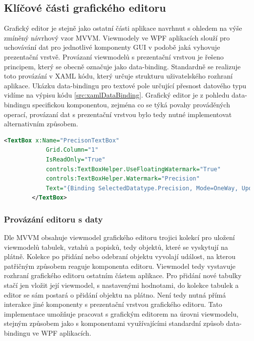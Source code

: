 \documentclass[czech,bachelor,public,dept460,male,oneside]{diploma}
\begin{document}
	\subsection{Klíčové části grafického editoru} \label{secKeyPartsEditor}
	Grafický editor je stejně jako ostatní části aplikace navrhnut s ohledem na výše zmíněný návrhový vzor MVVM. Viewmodely ve WPF aplikacích slouží pro uchovávání dat pro jednotlivé komponenty GUI v podobě jaká vyhovuje prezentační vrstvě. Provázaní viewmodelů s prezentační vrstvou je řešeno principem, který se obecně označuje jako data-binding. Standardně se realizuje toto provázání v XAML kódu, který určuje strukturu uživatelského rozhraní aplikace. Ukázku data-bindingu pro textové pole určující přesnost datového typu vidíme na výpisu kódu \ref{src:xamlDataBinding}. Grafický editor je z pohledu data-bindingu specifickou komponentou, zejména co se týká povahy prováděných operací, provázaní dat s prezentační vrstvou bylo tedy nutné implementovat alternativním způsobem. 
		
		\begin{lstlisting}[language=xml,label=src:xamlDataBinding,caption=Příklad data-bindingu v XAML pro textové pole]
		<TextBox x:Name="PrecisonTextBox"
			Grid.Column="1"
			IsReadOnly="True"
			controls:TextBoxHelper.UseFloatingWatermark="True"
			controls:TextBoxHelper.Watermark="Precision"
			Text="{Binding SelectedDatatype.Precision, Mode=OneWay, UpdateSourceTrigger=PropertyChanged}">
		</TextBox>
		\end{lstlisting}
		
		\subsubsection{Provázání editoru s daty}
		Dle MVVM obsahuje viewmodel grafického editoru trojici kolekcí pro uložení viewmodelů tabulek, vztahů a popisků, tedy objektů, které se vyskytují na plátně. Kolekce po přidání nebo odebraní objektu vyvolají událost, na kterou patřičným způsobem reaguje komponenta editoru. Viewmodel tedy vystavuje rozhraní grafického editoru ostatním částem aplikace. Pro přidání nové tabulky stačí jen vložit její viewmodel, s nastavenými hodnotami, do kolekce tabulek a editor se sám postará o přidání objektu na plátno. Není tedy nutná přímá interakce jiné komponenty s prezentační vrstvou grafického editoru. Tato implementace umožňuje pracovat s grafickým editorem na úrovni viewmodelu, stejným způsobem jako s komponentami využívajícími standardní způsob data-bindingu ve WPF aplikacích. 
		
\end{document}
